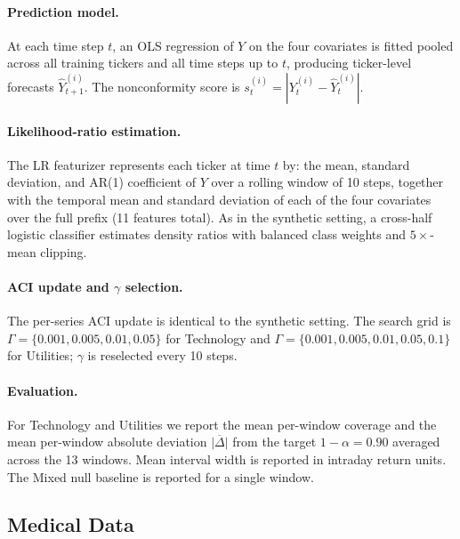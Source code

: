 \paragraph{Prediction model.}
At each time step $t$, an OLS regression of $Y$ on the four covariates is
fitted pooled across all training tickers and all time steps up to $t$,
producing ticker-level forecasts $\hat Y_{t+1}^{(i)}$.  The nonconformity
score is $s_t^{(i)} = |Y_t^{(i)} - \hat Y_t^{(i)}|$.

\paragraph{Likelihood-ratio estimation.}
The LR featurizer represents each ticker at time $t$ by: the mean, standard
deviation, and AR(1) coefficient of $Y$ over a rolling window of 10 steps,
together with the temporal mean and standard deviation of each of the four
covariates over the full prefix (11 features total).  As in the synthetic
setting, a cross-half logistic classifier estimates density ratios with
balanced class weights and $5\times$-mean clipping.

\paragraph{ACI update and $\gamma$ selection.}
The per-series ACI update is identical to the synthetic setting.  The search
grid is $\Gamma = \{0.001, 0.005, 0.01, 0.05\}$ for Technology and
$\Gamma = \{0.001, 0.005, 0.01, 0.05, 0.1\}$ for Utilities; $\gamma$ is
reselected every 10 steps.

\paragraph{Evaluation.}
For Technology and Utilities we report the mean per-window coverage and the
mean per-window absolute deviation $\overline{|\Delta|}$ from the target
$1-\alpha = 0.90$ averaged across the 13 windows.  Mean interval width is
reported in intraday return units.  The Mixed null baseline is reported for a
single window.


\subsection{Medical Data}
\label{sec:experiments:medical}

